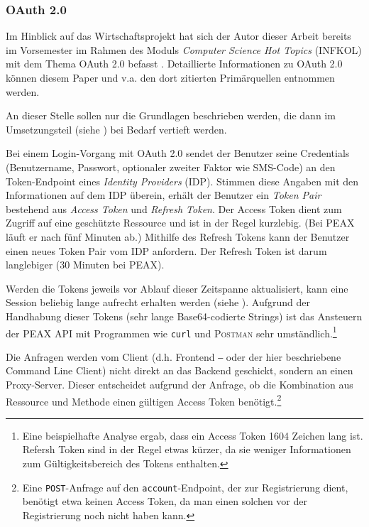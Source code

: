 \subsubsection{OAuth 2.0}

Im Hinblick auf das Wirtschaftsprojekt hat sich der Autor dieser Arbeit bereits im Vorsemester im Rahmen des Moduls \textit{Computer Science Hot Topics} (INFKOL) mit dem Thema OAuth 2.0 befasst \cite{infkol-oauth}. Detaillierte Informationen zu OAuth 2.0 können diesem Paper und v.a. den dort zitierten Primärquellen entnommen werden.

An dieser Stelle sollen nur die Grundlagen beschrieben werden, die dann im Umsetzungsteil (siehe ) bei Bedarf vertieft werden.

Bei einem Login-Vorgang mit OAuth 2.0 sendet der Benutzer seine Credentials (Benutzername, Passwort, optionaler zweiter Faktor wie SMS-Code) an den Token-Endpoint eines \textit{Identity Providers} (IDP). Stimmen diese Angaben mit den Informationen auf dem IDP überein, erhält der Benutzer ein \textit{Token Pair} bestehend aus \textit{Access Token} und \textit{Refresh Token}. Der Access Token dient zum Zugriff auf eine geschützte Ressource und ist in der Regel kurzlebig. (Bei PEAX läuft er nach fünf Minuten ab.) Mithilfe des Refresh Tokens kann der Benutzer einen neues Token Pair vom IDP anfordern. Der Refresh Token ist darum langlebiger (30 Minuten bei PEAX).

Werden die Tokens jeweils vor Ablauf dieser Zeitspanne aktualisiert, kann eine Session beliebig lange aufrecht erhalten werden (siehe ). Aufgrund der Handhabung dieser Tokens (sehr lange Base64-codierte Strings) ist das Ansteuern der PEAX API mit Programmen wie \texttt{curl} und \textsc{Postman} sehr umständlich.\footnote{Eine beispielhafte Analyse ergab, dass ein Access Token 1604 Zeichen lang ist. Refersh Token sind in der Regel etwas kürzer, da sie weniger Informationen zum Gültigkeitsbereich des Tokens enthalten.}

Die Anfragen werden vom Client (d.h. Frontend ‒ oder der hier beschriebene Command Line Client) nicht direkt an das Backend geschickt, sondern an einen Proxy-Server. Dieser entscheidet aufgrund der Anfrage, ob die Kombination aus Ressource und Methode einen gültigen Access Token benötigt.\footnote{Eine \texttt{POST}-Anfrage auf den \texttt{account}-Endpoint, der zur Registrierung dient, benötigt etwa keinen Access Token, da man einen solchen vor der Registrierung noch nicht haben kann.} 

